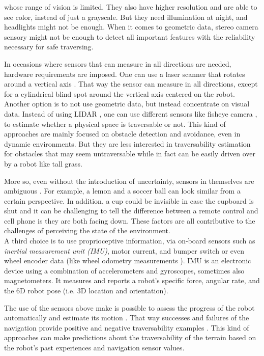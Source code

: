 \documentclass[12pt,a4paper,table,dvipsnames,tikz]{report}
\newcommand{\term}{\textit}
\newcommand{\acronym}{\MakeUppercase}
\begin{document}
	whose range of vision is limited. They also have higher resolution and are able 
	to see color, instead of just a grayscale. But they need illumination at night, 
	and headlights might not be enough. When it comes to geometric data, stereo 
	camera sensory might not be enough to detect all important features with the 
	reliability necessary for safe traversing.
	\par
	In occasions where sensors that can measure in all directions are needed, 
	hardware requirements are imposed. One can use a laser scanner that rotates 
	around a vertical axis \citep{Droeschel}. That way the sensor can measure in 
	all directions, except for a cylindrical blind spot around the vertical axis 
	centered on the robot.
	\\
	
	Another option is to not use geometric data, but instead concentrate on visual 
	data. Instead of using \acronym{lidar} \citep{Suger, Lalonde}, one can use 
	different sensors like fisheye camera \citep{Hirose, HiroseGonet}, 
	to estimate whether a physical space is traversable or not. This kind of 
	approaches are mainly focused on obstacle detection and avoidance, even in 
	dynamic environments. But they are less interested in traversability 
	estimation for obstacles that may seem untraversable while in fact can be 
	easily driven over by a robot like tall grass.
	\par
	More so, even without the introduction of uncertainty, sensors in themselves are 
	ambiguous \citep{Shabbir}. For example, a lemon and a soccer ball can look 
	similar from a certain perspective. In addition, a cup could be invisible in case 
	the cupboard is shut and it can be challenging to tell the difference between a 
	remote control and cell phone is they are both facing down. These factors are all
	contributive to the challenges of perceiving the state of the environment.
	\\
	
	A third choice is to use proprioceptive information, via on-board sensors such 
	as \term{inertial measurement unit (\acronym{imu})}, motor current, and bumper 
	switch \citep{Kim} or even wheel encoder data \citep{Lee} (like wheel odometry 
	measurements \citep{Droeschel}). \acronym{imu} is an electronic device using 
	a combination of accelerometers and gyroscopes, sometimes also magnetometers. 
	It measures and reports a robot's specific force, angular rate, and the 
	\acronym{6d} robot pose (i.e. \acronym{3d} location and orientation).
	\par
	The use of the sensors above make is possible to assess the progress of the 
	robot automatically and estimate its motion \citep{Droeschel}. That way successes 
	and failures of the navigation provide positive and negative traversability 
	examples \citep{Kim}. This kind of approaches can make predictions about the 
	traversability of the terrain based on the robot's past experiences and 
	navigation sensor values.
	\\
	
\end{document}
